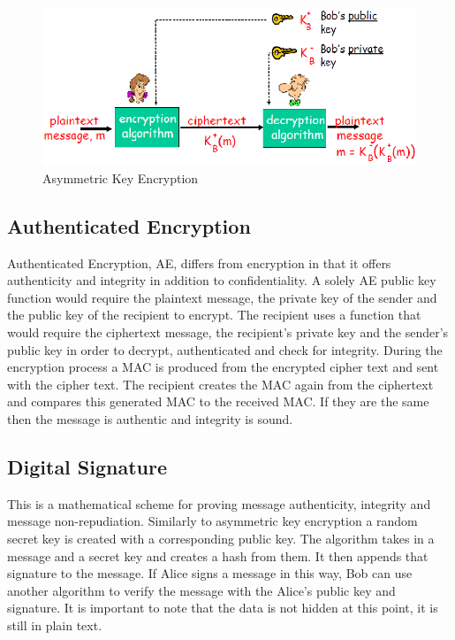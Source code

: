 \begin{figure}[H]
	\centering
	\includegraphics[width=1\linewidth]{Figures/publickeyex.png}
	\caption{Asymmetric Key Encryption}
	\label{fig:asy}
\end{figure}

\subsection{Authenticated Encryption}

Authenticated Encryption, AE, differs from encryption in that it offers authenticity and integrity in addition to confidentiality. A solely AE public key function would require the plaintext message, the private key of the sender and the public key of the recipient to encrypt. The recipient uses a function that would require the ciphertext message, the recipient's private key and the sender's public key in order to decrypt, authenticated and check for integrity. During the encryption process a MAC is produced from the encrypted cipher text and sent with the cipher text. The recipient creates the MAC again from the ciphertext and compares this generated MAC to the received MAC. If they are the same then the message is authentic and integrity is sound. 

\subsection{Digital Signature}

This is a mathematical scheme for proving message authenticity, integrity and message non-repudiation. Similarly to asymmetric key encryption a random secret key is created with a corresponding public key. The algorithm takes in a message and a secret key and creates a hash from them. It then appends that signature to the message. If Alice signs a message in this way, Bob can use another algorithm to verify the message with the Alice's public key and signature. It is important to note that the data is not hidden at this point, it is still in plain text.

